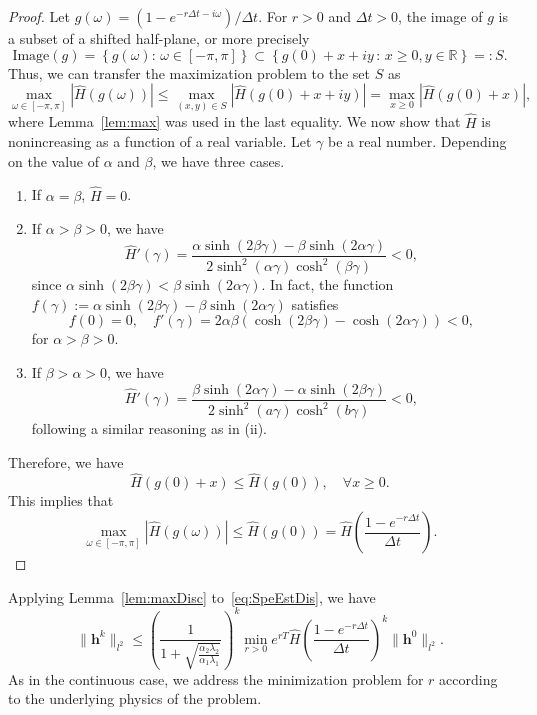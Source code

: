 \documentclass[10pt,a4paper]{amsart}
\begin{document}
\begin{proof}
Let $g(\omega) =(1-e^{-r \Delta t - i \omega})/ \Delta t$. For $r>0$ and $\Delta t>0$, the image of $g$ is a subset of a shifted half-plane, or more precisely
\[\text{Image}(g) = \left\{g(\omega): \, \omega \in [-\pi,\pi]\right\} \subset \left\{g(0) + x + iy \, : \,x\geq 0, y \in \mathbb{R} \right\} =: S.\]
Thus, we can transfer the maximization problem to the set $S$ as
\[\max_{\omega \in [-\pi,\pi]} \left| \hat{H}\left(g(\omega)\right) \right| \leq \max_{(x,y) \in S} \left| \hat{H} \left(g(0) + x + iy\right) \right| 
=  \max_{x \geq 0} \left| \hat H \left(g(0) + x\right) \right|,\]
where Lemma~\ref{lem:max} was used in the last equality. We now show that $\hat H$ is nonincreasing as a function of a real variable. Let $\gamma$ be a real number. Depending on the value of $\alpha$ and $\beta$, we have three cases.

\begin{enumerate}
\item[(i)] If $\alpha=\beta$, $\hat H = 0$. 

\item[(ii)] If $\alpha>\beta>0$, we have
\[\hat{H}'(\gamma) = \frac{\alpha \sinh(2 \beta \gamma) - \beta \sinh(2\alpha \gamma)}{2 \sinh^2(\alpha \gamma) \cosh^2(\beta \gamma)} < 0,\]
since $\alpha \sinh(2 \beta \gamma) < \beta \sinh(2\alpha \gamma)$. In fact, the function $f(\gamma) := \alpha \sinh(2 \beta \gamma) - \beta \sinh(2\alpha \gamma)$ satisfies
\[f(0) = 0, \quad f'(\gamma) = 2\alpha\beta(\cosh(2 \beta \gamma)-\cosh(2 \alpha \gamma)) < 0,\] 
for $\alpha > \beta >0$. 

\item[(iii)] If $\beta>\alpha>0$, we have
\[\hat{H}'(\gamma) = \frac{\beta \sinh(2 \alpha \gamma) -\alpha \sinh(2\beta \gamma)}{2 \sinh^2(a \gamma) \cosh^2(b \gamma)} < 0,\]
following a similar reasoning as in (ii). 
\end{enumerate}
Therefore, we have
\[\hat{H} \left(g(0) + x\right) \leq  \hat{H} \left(g(0)\right),
\quad \forall x \geq 0.\] 
This implies that
\[\max_{\omega \in [-\pi,\pi]} \left| \hat{H}\left(g(\omega)\right) \right|	
\leq \hat{H}\left(g(0)\right) = \hat{H}\left( \frac{1-e^{-r\Delta t}}{\Delta t} \right).\] 
\end{proof}


Applying Lemma~\ref{lem:maxDisc} to~\eqref{eq:SpeEstDis}, we have 
\begin{equation}\label{eq:min-disc}
\|\boldsymbol{h}^k\|_{l^2} \leq \left(\frac{1}{1+\sqrt{\frac{\alpha_2\lambda_2}{\alpha_1\lambda_1}}}\right)^k \min_{r > 0} e^{rT} \hat H\left(\frac{1-e^{-r \Delta t}}{\Delta t}\right)^k \|\boldsymbol{h}^0\|_{l^2}.
\end{equation}
As in the continuous case, we address the minimization problem for $r$ according to the underlying physics of the problem.
\end{document}

